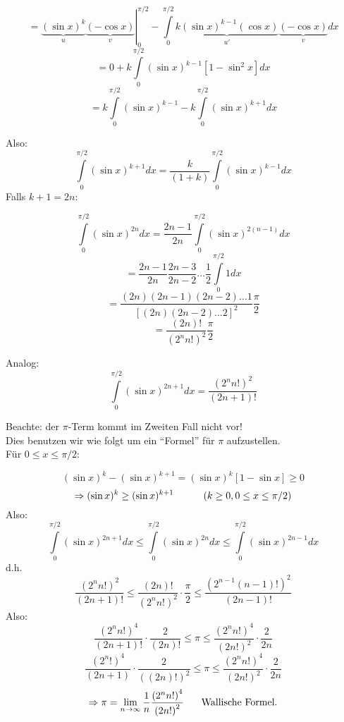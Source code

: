 $$ = \left. {\underbrace {{{(\sin x)}^k}}_u\underbrace {( - \cos x)}_v} \right|_0^{\pi /2} - \int\limits_0^{\pi /2} {\underbrace {k{{(\sin x)}^{k - 1}}(\cos x)}_{u'}} \underbrace {( - \cos x)}_vdx$$
$$ = 0 + k\int\limits_0^{\pi /2} {{{(\sin x)}^{k - 1}}} \left[ {1 - {{\sin }^2}x} \right]dx$$
$$ = k\int\limits_0^{\pi /2} {{{(\sin x)}^{k - 1}} - k\int\limits_0^{\pi /2} {{{(\sin x)}^{k + 1}}dx} } $$


Also:
\[\int\limits_0^{\pi /2} {{{(\sin x)}^{k + 1}}dx = \frac{k}{{(1 + k)}}\int\limits_0^{\pi /2} {{{(\sin x)}^{k - 1}}dx} } \]
Falls $k+1=2n$:

$$\int\limits_0^{\pi /2} {{{(\sin x)}^{2n}}dx = \frac{{2n - 1}}{{2n}}\int\limits_0^{\pi /2} {{{(\sin x)}^{2(n - 1)}}dx} } $$
$$ = \frac{{2n - 1}}{{2n}}\frac{{2n - 3}}{{2n - 2}} \ldots \frac{1}{2}\int\limits_0^{\pi /2} {1dx} $$
$$ = \frac{{(2n)(2n - 1)(2n - 2) \ldots 1}}{{{{\left[ {(2n)(2n - 2) \ldots 2} \right]}^2}}}\frac{\pi }{2}$$
$$ = \frac{{(2n)!}}{{{{({2^n}n!)}^2}}}\frac{\pi }{2}$$

\noindent Analog:
\[\int\limits_0^{\pi /2} {{{(\sin x)}^{2n + 1}}dx = \frac{{{{({2^n}n!)}^2}}}{{(2n + 1)!}}} \]

\noindent Beachte: der $\pi$-Term kommt im Zweiten Fall nicht vor!\\

\noindent Dies benutzen wir wie folgt um ein ``Formel'' für $\pi$ aufzustellen.\\

\noindent Für $0\leq x \leq\pi/2$:

\[{(\sin x)^k} - {(\sin x)^{k + 1}} = {(\sin x)^k}\left[ {1 - \sin x} \right] \ge 0\]
\[ \Rightarrow {(\sin x)^k} \geq {(\sin x)^{k + 1}}\text{\hspace{10mm}} \left( k\geq 0,0\leq x \leq \pi/2\right)\]
Also:
\[\int\limits_0^{\pi /2} {{{(\sin x)}^{2n + 1}}dx \le \int\limits_0^{\pi /2} {{{(\sin x)}^{2n}}dx \le \int\limits_0^{\pi /2} {{{(\sin x)}^{2n - 1}}dx} } } \]
d.h.
\[\frac{{{{({2^n} n!)}^2}}}{{(2n + 1)!}} \le \frac{{(2n)!}}{{{{({2^n}n!)}^2}}} \cdot \frac{\pi }{2} \le \frac{{{{\left( {{2^{n - 1}}(n - 1)!} \right)}^2}}}{{(2n - 1)!}}\]
Also:
\[\frac{{{{({2^n}n!)}^4}}}{{(2n + 1)!}} \cdot \frac{2}{{(2n)!}} \le \pi  \le \frac{{{{({2^n}n!)}^4}}}{{{{(2n!)}^2}}} \cdot \frac{2}{{2n}}\]
\[\frac{{{{({2^n}!)}^4}}}{{(2n + 1)}} \cdot \frac{2}{{{{((2n)!)}^2}}} \le \pi  \le \frac{{{{({2^n}n!)}^4}}}{{{{(2n!)}^2}}} \cdot \frac{2}{{2n}}\]
\[ \Rightarrow \pi  = \mathop {\lim }\limits_{n \to \infty } \frac{1}{n}\frac{{{{({2^n}n!)}^4}}}{{{{(2n!)}^2}}}\text{\hspace{5mm} Wallische Formel.}\]

